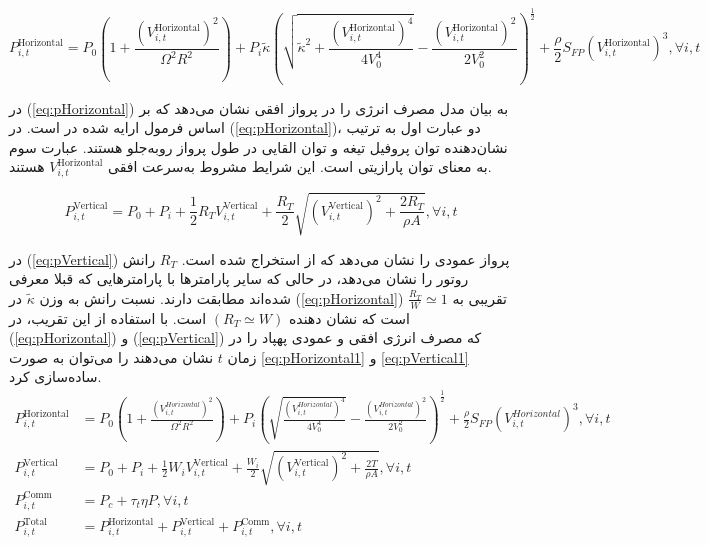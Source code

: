 \begin{equation}
\label{eq:pHorizontal}
P_{i,t}^{\mathrm{Horizontal}}=P_{0}\left ( 1+ \frac{\left (V_{i,t}^{\mathrm{Horizontal}}  \right )^{2}}{\Omega ^{2} R^{2}} \right )+ P_{i} \widetilde{\kappa} \left (\sqrt{\widetilde{\kappa}^{2} + \frac{\left ( V_{i,t}^{\mathrm{Horizontal}} \right )^{4}}{4V_{0}^{4}}}-\frac{\left ( V_{i,t}^{\mathrm{Horizontal}} \right )^{2}}{2 V_{0}^{2}} \right )^{\frac{1}{2}}+\frac{\rho}{2} S_{FP}\left ( V_{i,t}^{\mathrm{Horizontal}} \right )^{3}, \forall i,t
\end{equation}

در (\autoref{eq:pHorizontal}) به بیان مدل مصرف انرژی  را در پرواز افقی نشان می‌دهد که بر اساس فرمول ارایه شده در \cite{8663615} است. در (\autoref{eq:pHorizontal})، دو عبارت اول به ترتیب نشان‌دهنده توان پروفیل تیغه و توان القایی در طول پرواز روبه‌جلو هستند. عبارت سوم به معنای توان پارازیتی است. این شرایط مشروط به‌سرعت افقی $V_{i,t}^{\mathrm{Horizontal}}$ هستند.

\begin{equation}
	\label{eq:pVertical}
	P_{i,t}^{\mathrm{Vertical}}=P_{0}+ P_{i}+ \frac{1}{2} R_{T} V_{i,t}^{\mathrm{Vertical}}+\frac{R_{T}}{2}\sqrt{\left (V_{i,t}^{\mathrm{Vertical}}  \right )^{2}+\frac{2 R_{T}}{\rho A}},  \forall i,t
\end{equation}

در (\autoref{eq:pVertical}) پرواز عمودی  را نشان می‌دهد که از \cite{10175052} استخراج شده است. $R_{T}$ رانش روتور را نشان می‌دهد، در حالی که سایر پارامترها با پارامترهایی که قبلا معرفی شده‌اند مطابقت دارند. نسبت رانش به وزن $\widetilde{\kappa}$ در (\autoref{eq:pHorizontal}) تقریبی به
$\frac{R_{T}}{W}\simeq 1$
 است که نشان دهنده $\left ( R_{T}\simeq W \right )$ است. با استفاده از این تقریب، در (\autoref{eq:pHorizontal}) و (\autoref{eq:pVertical}) که مصرف انرژی افقی و عمودی پهپاد را در زمان $t$ نشان می‌دهند را می‌توان به صورت \autoref{eq:pHorizontal1} و \autoref{eq:pVertical1} ساده‌سازی کرد. 
\begin{align}
	P_{i,t}^{\mathrm{Horizontal}}&=P_{0}\left ( 1+  \frac{\left (V_{i,t}^{Horizontal}  \right )^{2}}{\Omega ^{2} R^{2}} \right )+ P_{i} \left (\sqrt{\frac{\left ( V_{i,t}^{Horizontal} \right )^{4}}{4V_{0}^{4}}}-\frac{\left ( V_{i,t}^{Horizontal} \right )^{2}}{2 V_{0}^{2}} \right )^{\frac{1}{2}}+\frac{\rho}{2} S_{FP}\left ( V_{i,t}^{Horizontal} \right )^{3},  \forall i,t	 \label{eq:pHorizontal1}\\
	P_{i,t}^{\mathrm{Vertical}}&=P_{0}+ P_{i}+ \frac{1}{2} W_{i} V_{i,t}^{\mathrm{Vertical}}+\frac{W_{i}}{2}\sqrt{\left (V_{i,t}^{\mathrm{Vertical}}  \right )^{2}+\frac{2T}{\rho A}},  \forall i,t 	\label{eq:pVertical1}\\
	P_{i,t}^{\mathrm{Comm}}&=P_{c}+  \tau _{t} \eta  P,  \forall i,t	 \label{eq:comm}\\
	P_{i,t}^{\mathrm{Total}}&= P_{i,t}^{\mathrm{Horizontal}}+ P_{i,t}^{\mathrm{Vertical}}+P_{i,t}^{\mathrm{Comm}},  \forall i,t \label{eq:pTotal}
\end{align}

